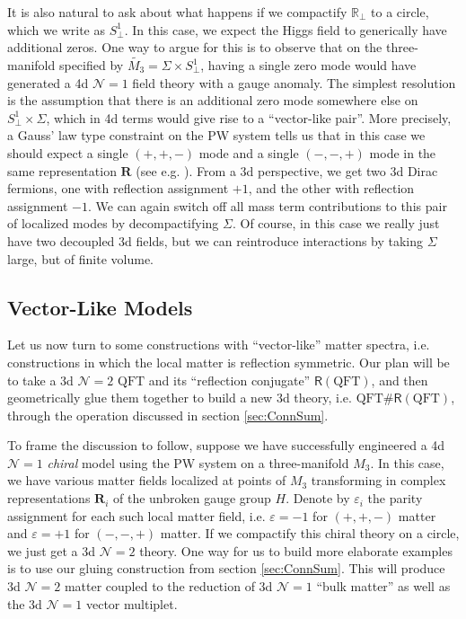 \documentclass[12pt]{article}%
\numberwithin{equation}{section}
\renewcommand{\(}{\left(}
\renewcommand{\)}{\right)}
\renewcommand{\[}{\left[}
\renewcommand{\]}{\right]}
\begin{document}
It is also natural to ask about what happens if we compactify $\mathbb{R}_{\bot}$ to a circle, which we write as $S^1_{\bot}$.
In this case, we expect the Higgs field to generically have additional zeros. One way to argue for this is to
observe that on the three-manifold specified by $\widetilde{M_3} = \Sigma \times S^{1}_{\bot}$, having a single zero mode would have
generated a 4d $\mathcal{N} = 1$ field theory with a gauge anomaly. The simplest resolution is the assumption that there is an additional
zero mode somewhere else on $S^{1}_{\bot} \times \Sigma$, which in 4d terms would give rise to a ``vector-like pair''. More precisely, a Gauss' law type constraint on the PW system tells us that in this case we should expect a single $(+,+,-)$ mode and a single $(-,-,+)$ mode in the
same representation $\mathbf{R}$ (see e.g. \cite{Braun:2018vhk}). From a 3d perspective, we get two 3d Dirac fermions, one with reflection assignment $+1$, and the other with reflection assignment $-1$. We can again switch off all mass term contributions to this pair of localized modes by decompactifying $\Sigma$. Of course, in this case we really just have two decoupled 3d fields, but we can reintroduce interactions by taking $\Sigma$ large, but of finite volume.

\subsection{Vector-Like Models}\label{ssec:veclike}

Let us now turn to some constructions with ``vector-like'' matter spectra,
i.e. constructions in which the local matter is reflection symmetric. Our plan will be to take
a 3d $\mathcal{N} = 2$ $\mathrm{QFT}$ and its ``reflection conjugate'' $\mathsf{R}(\mathrm{QFT})$,
and then geometrically glue them together to build a new 3d theory, i.e. $\mathrm{QFT} \# \mathsf{R}(\mathrm{QFT})$,
through the operation discussed in section \ref{sec:ConnSum}.

To frame the discussion to follow, suppose we have successfully engineered a 4d $\mathcal{N} = 1$ \textit{chiral} model
using the PW system on a three-manifold $M_3$. In this case, we have various matter fields localized at points of
$M_3$ transforming in complex representations $\mathbf{R}_i$ of the unbroken gauge group $H$. Denote by $\varepsilon_i$ the
parity assignment for each such local matter field, i.e. $\varepsilon = -1$ for $(+,+,-)$ matter and $\varepsilon = +1$ for $(-,-,+)$
matter. If we compactify this chiral theory on a circle, we just get a 3d $\mathcal{N} = 2$ theory. One way for us to
build more elaborate examples is to use our gluing construction from section \ref{sec:ConnSum}.
This will produce 3d $\mathcal{N} = 2$ matter coupled to the reduction of 3d $\mathcal{N} = 1$ ``bulk matter'' as well as the 3d $\mathcal{N}  = 1$ vector multiplet.
\end{document}

